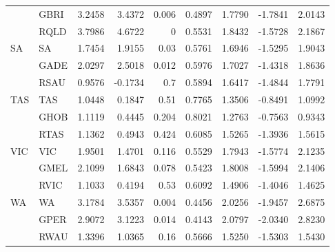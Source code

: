 \begin{table}[htbp]
{\begin{tabular}{llrrrrrrr}
          & GBRI  & 3.2458 & 3.4372 & 0.006 & 0.4897 & 1.7790 & -1.7841 & 2.0143 \\
          & RQLD  & 3.7986 & 4.6722 & 0     & 0.5531 & 1.8432 & -1.5728 & 2.1867 \\
    \multirow{3}[0]{*}{SA} & SA    & 1.7454 & 1.9155 & 0.03  & 0.5761 & 1.6946 & -1.5295 & 1.9043 \\
          & GADE  & 2.0297 & 2.5018 & 0.012 & 0.5976 & 1.7027 & -1.4318 & 1.8636 \\
          & RSAU  & 0.9576 & -0.1734 & 0.7   & 0.5894 & 1.6417 & -1.4844 & 1.7791 \\
    \multirow{3}[0]{*}{TAS} & TAS   & 1.0448 & 0.1847 & 0.51  & 0.7765 & 1.3506 & -0.8491 & 1.0992 \\
          & GHOB  & 1.1119 & 0.4445 & 0.204 & 0.8021 & 1.2763 & -0.7563 & 0.9343 \\
          & RTAS  & 1.1362 & 0.4943 & 0.424 & 0.6085 & 1.5265 & -1.3936 & 1.5615 \\
    \multirow{3}[0]{*}{VIC} & VIC   & 1.9501 & 1.4701 & 0.116 & 0.5529 & 1.7943 & -1.5774 & 2.1235 \\
          & GMEL  & 2.1099 & 1.6843 & 0.078 & 0.5423 & 1.8008 & -1.5994 & 2.1406 \\
          & RVIC  & 1.1033 & 0.4194 & 0.53  & 0.6092 & 1.4906 & -1.4046 & 1.4625 \\
    \multirow{3}[1]{*}{WA} & WA    & 3.1784 & 3.5357 & 0.004 & 0.4456 & 2.0256 & -1.9457 & 2.6875 \\
          & GPER  & 2.9072 & 3.1223 & 0.014 & 0.4143 & 2.0797 & -2.0340 & 2.8230 \\
          & RWAU  & 1.3396 & 1.0365 & 0.16  & 0.5666 & 1.5250 & -1.5303 & 1.5430 \\
  
    
   
    \bottomrule
    \end{tabular}%


   
 
  }%
\end{table}%

   
